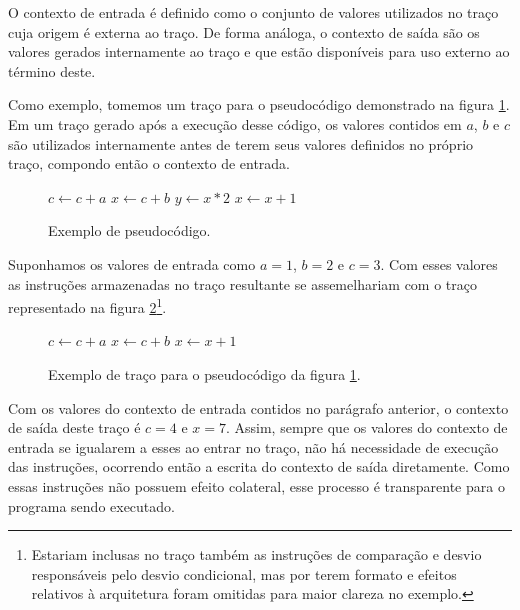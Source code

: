 O contexto de entrada é definido como o conjunto de valores utilizados no traço cuja origem é externa ao traço. De forma análoga, o contexto de saída são os valores gerados internamente ao traço e que estão disponíveis para uso externo ao término deste.

Como exemplo, tomemos um traço para o pseudocódigo demonstrado na figura \ref{Fig:ExemploContexto1}. Em um traço gerado após a execução desse código, os valores contidos em $a$, $b$ e $c$ são utilizados internamente antes de terem seus valores definidos no próprio traço, compondo então o contexto de entrada.

\begin{figure}[!h]
	\label{Fig:ExemploContexto1}
	\caption[Exemplo de pseudocódigo]{
		Exemplo de pseudocódigo.}
	
		\begin{algorithmic}
			\STATE $c \leftarrow c + a$
			\STATE $x \leftarrow c + b$
			\STATE $y \leftarrow x * 2$
			\ELSE
			\STATE $x \leftarrow x + 1$
			\ENDIF
		\end{algorithmic}
	\legend{Fonte: elaborada pelo autor}
\end{figure}

Suponhamos os valores de entrada como $a = 1$, $b = 2$ e $c = 3$. Com esses valores as instruções armazenadas no traço resultante se assemelhariam com o traço representado na figura \ref{Fig:ExemploContexto2}\footnote{Estariam inclusas no traço também as instruções de comparação e desvio responsáveis pelo desvio condicional, mas por terem formato e efeitos relativos à arquitetura foram omitidas para maior clareza no exemplo.}. 

\begin{figure}[!h]
	\label{Fig:ExemploContexto2}
	\caption[Exemplo de traço para o pseudocódigo da figura \ref{Fig:ExemploContexto1}]{
		Exemplo de traço para o pseudocódigo da figura \ref{Fig:ExemploContexto1}.}
	
	\begin{algorithmic}
		\STATE $c \leftarrow c + a$
		\STATE $x \leftarrow c + b$
		\STATE $x \leftarrow x + 1$
	\end{algorithmic}
\end{figure}

Com os valores do contexto de entrada contidos no parágrafo anterior, o contexto de saída deste traço é $c = 4$ e $x = 7$. Assim, sempre que os valores do contexto de entrada se igualarem a esses ao entrar no traço, não há necessidade de execução das instruções, ocorrendo então a escrita do contexto de saída diretamente. Como essas instruções não possuem efeito colateral, esse processo é transparente para o programa sendo executado.

